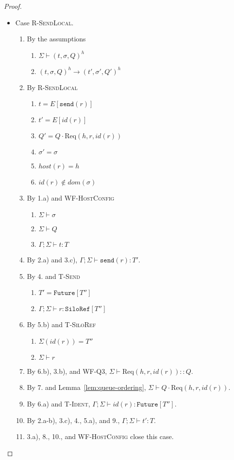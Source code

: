 \documentclass{article}
\theoremstyle{definition}
\newcommand{\Req}[3]{\text{Req}(#1, #2, #3)}
\begin{document}
\begin{proof}
\begin{itemize}
\item Case \textsc{R-SendLocal}.
\begin{enumerate}
\item By the assumptions
  \begin{enumerate}[label=(\alph*)]
  \item $\Sigma \vdash (t, \sigma, Q)^h$
  \item $(t, \sigma, Q)^h \longrightarrow (t', \sigma', Q')^h$
  \end{enumerate}
\item By \textsc{R-SendLocal}
  \begin{enumerate}[label=(\alph*)]
  \item $t = E[\texttt{send}(r)]$
  \item $t' = E[id(r)]$
  \item $Q' = Q \cdot {\Req h r {id(r)}}$
  \item $\sigma' = \sigma$
  \item $host(r) = h$
  \item $id(r) \notin dom(\sigma)$
  \end{enumerate}
\item By 1.a) and \textsc{WF-HostConfig}
  \begin{enumerate}[label=(\alph*)]
  \item $\Sigma \vdash \sigma$  %
  \item $\Sigma \vdash Q$
  \item $\Gamma ; \Sigma \vdash t : T$
  \end{enumerate}
\item By 2.a) and 3.c), $\Gamma ; \Sigma \vdash \texttt{send}(r) : T'$.
\item By 4. and \textsc{T-Send}
  \begin{enumerate}[label=(\alph*)]
  \item $T' = \texttt{Future}[T'']$
  \item $\Gamma ; \Sigma \vdash r : \texttt{SiloRef}[T'']$
  \end{enumerate}
\item By 5.b) and \textsc{T-SiloRef}
  \begin{enumerate}[label=(\alph*)]
  \item $\Sigma(id(r)) = T''$
  \item $\Sigma \vdash r$
  \end{enumerate}
\item By 6.b), 3.b), and \textsc{WF-Q3}, $\Sigma \vdash {\Req h r {id(r)}} :: Q$.
\item By 7. and Lemma~\ref{lem:queue-ordering}, $\Sigma \vdash Q \cdot {\Req h r {id(r)}}$.
\item By 6.a) and \textsc{T-Ident}, $\Gamma ; \Sigma \vdash id(r) : \texttt{Future}[T'']$.
\item By 2.a-b), 3.c), 4., 5.a), and 9., $\Gamma ; \Sigma \vdash t' : T$.
\item 3.a), 8., 10., and \textsc{WF-HostConfig} close this case.
\end{enumerate}


\end{itemize}
\end{proof}
\end{document}
